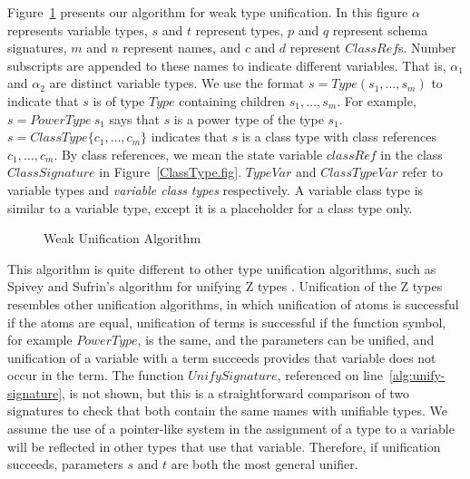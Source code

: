 Figure~\ref{weak-unification-algorithm} presents our algorithm for
weak type unification. In this figure $\alpha$ represents variable
types, $s$ and $t$ represent types, $p$ and $q$ represent schema
signatures, $m$ and $n$ represent names, and $c$ and $d$ represent
$ClassRef$s. Number subscripts are appended to these names to indicate
different variables. That is, $\alpha_1$ and $\alpha_2$ are distinct
variable types. We use the format $s = Type(s_1, \ldots, s_m)$ to
indicate that $s$ is of type $Type$ containing children $s_1, \ldots,
s_m$. For example, $s = PowerType~s_1$ says that $s$ is a power type
of the type $s_1$. $s = ClassType \{c_1, \ldots, c_m\}$ indicates that
$s$ is a class type with class references $c_1, \ldots, c_m$. By class
references, we mean the state variable $classRef$ in the class
$ClassSignature$ in Figure~\ref{ClassType.fig}. $TypeVar$ and
$ClassTypeVar$ refer to variable types and {\em variable class types}
respectively. A variable class type is similar to a variable type,
except it is a placeholder for a class type only.

\begin{figure}

\caption{Weak Unification Algorithm}
\label{weak-unification-algorithm}
\end{figure}

%

This algorithm is quite different to other type unification
algorithms, such as Spivey and Sufrin's algorithm for unifying Z
types \cite{spivey90}. Unification of the Z types resembles other
unification algorithms, in which unification of atoms is successful if
the atoms are equal, unification of terms is successful if the
function symbol, for example $PowerType$, is the same, and the
parameters can be unified, and unification of a variable with a term
succeeds provides that variable does not occur in the term. The
function $UnifySignature$, referenced on
line~\ref{alg:unify-signature}, is not shown, but this is a
straightforward comparison of two signatures to check that both
contain the same names with unifiable types. We assume the use of a
pointer-like system in the assignment of a type to a variable will be
reflected in other types that use that variable. Therefore, if
unification succeeds, parameters $s$ and $t$ are both the most general
unifier.

